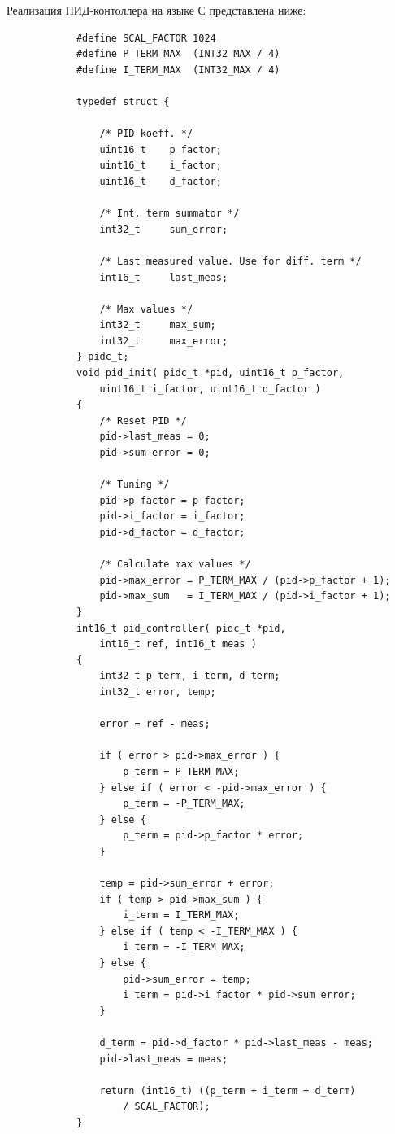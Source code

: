         Реализация ПИД-контоллера на языке С представлена ниже:
        \begin{verbatim}
            #define SCAL_FACTOR 1024
            #define P_TERM_MAX  (INT32_MAX / 4)
            #define I_TERM_MAX  (INT32_MAX / 4)

            typedef struct {

                /* PID koeff. */
                uint16_t    p_factor;
                uint16_t    i_factor;
                uint16_t    d_factor;

                /* Int. term summator */
                int32_t     sum_error;

                /* Last measured value. Use for diff. term */
                int16_t     last_meas;

                /* Max values */
                int32_t     max_sum;
                int32_t     max_error;
            } pidc_t;
            void pid_init( pidc_t *pid, uint16_t p_factor,
                uint16_t i_factor, uint16_t d_factor )
            {
                /* Reset PID */
                pid->last_meas = 0;
                pid->sum_error = 0;

                /* Tuning */
                pid->p_factor = p_factor;
                pid->i_factor = i_factor;
                pid->d_factor = d_factor;

                /* Calculate max values */
                pid->max_error = P_TERM_MAX / (pid->p_factor + 1);
                pid->max_sum   = I_TERM_MAX / (pid->i_factor + 1);
            }
            int16_t pid_controller( pidc_t *pid, 
                int16_t ref, int16_t meas )
            {
                int32_t p_term, i_term, d_term;
                int32_t error, temp;

                error = ref - meas;

                if ( error > pid->max_error ) {
                    p_term = P_TERM_MAX;
                } else if ( error < -pid->max_error ) {
                    p_term = -P_TERM_MAX;
                } else {
                    p_term = pid->p_factor * error;
                }

                temp = pid->sum_error + error;
                if ( temp > pid->max_sum ) {
                    i_term = I_TERM_MAX;
                } else if ( temp < -I_TERM_MAX ) {
                    i_term = -I_TERM_MAX;
                } else {
                    pid->sum_error = temp;
                    i_term = pid->i_factor * pid->sum_error;
                }

                d_term = pid->d_factor * pid->last_meas - meas;
                pid->last_meas = meas;

                return (int16_t) ((p_term + i_term + d_term) 
                    / SCAL_FACTOR);
            }
        \end{verbatim}

